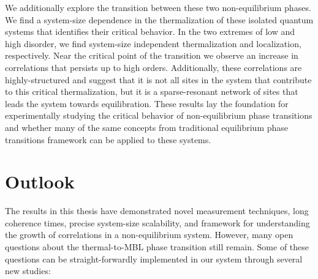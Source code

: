 We additionally explore the transition between these two non-equilibrium phases. We find a system-size dependence in the thermalization of these isolated quantum systems that identifies their critical behavior. In the two extremes of low and high disorder, we find system-size independent thermalization and localization, respectively. Near the critical point of the transition we observe an increase in correlations that persists up to high orders. Additionally, these correlations are highly-structured and suggest that it is not all sites in the system that contribute to this critical thermalization, but it is a sparse-resonant network of sites that leads the system towards equilibration. These results lay the foundation for experimentally studying the critical behavior of non-equilibrium phase transitions and whether many of the same concepts from traditional equilibrium phase transitions framework can be applied to these systems\cite{Rispoli2018}.

\section{Outlook}

The results in this thesis have demonstrated novel measurement techniques, long coherence times, precise system-size scalability, and framework for understanding the growth of correlations in a non-equilibrium system. However, many open questions about the thermal-to-MBL phase transition still remain. Some of these questions can be straight-forwardly implemented in our system through several new studies:

%

